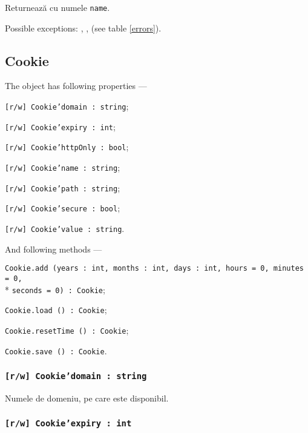 Returnează \cookie{} cu numele \texttt{name}.

Possible exceptions: , ,  (see table \ref{errors}).

\subsection{{\color{orange} Cookie}}

The object \cookie{} has following properties —
\begin{icItems}
	\item \texttt{[r/w] Cookie'domain : string};
	\item \texttt{[r/w] Cookie'expiry : int};
	\item \texttt{[r/w] Cookie'httpOnly : bool};
	\item \texttt{[r/w] Cookie'name : string};
	\item \texttt{[r/w] Cookie'path : string};
	\item \texttt{[r/w] Cookie'secure : bool};
	\item \texttt{[r/w] Cookie'value : string}.
\end{icItems}

And following methods —
\begin{icItems}
	\item \texttt{Cookie.add (years : int, months : int, days : int, hours = 0, minutes = 0,}\\* \texttt{seconds = 0) : Cookie};
	\item \texttt{Cookie.load () : Cookie};
	\item \texttt{Cookie.resetTime () : Cookie};
	\item \texttt{Cookie.save () : Cookie}.
\end{icItems}

\subsubsection{\texttt{[r/w] Cookie'domain : string}}

Numele de domeniu, pe care \cookie{} este disponibil.

\subsubsection{\texttt{[r/w] Cookie'expiry : int}}

